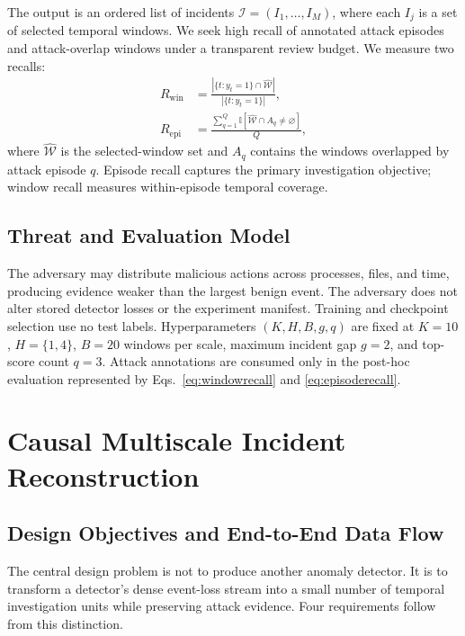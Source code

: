 \documentclass[lettersize,journal]{IEEEtran}
\newcommand{\ind}{\mathbb{I}}
\begin{document}
The output is an ordered list of incidents
$\mathcal{I}=(I_1,\ldots,I_M)$, where each $I_j$ is a set of selected temporal
windows.  We seek high recall of annotated attack episodes and attack-overlap
windows under a transparent review budget.  We measure two recalls:
\begin{align}
 R_{\mathrm{win}} & = \frac{|\{t:y_t=1\}\cap\widehat{\mathcal W}|}
 {|\{t:y_t=1\}|}, \label{eq:windowrecall}\\
 R_{\mathrm{epi}} & = \frac{\sum_{q=1}^{Q}
 \ind[\widehat{\mathcal W}\cap A_q\neq\varnothing]}{Q},
 \label{eq:episoderecall}
\end{align}
where $\widehat{\mathcal W}$ is the selected-window set and $A_q$ contains the
windows overlapped by attack episode $q$.  Episode recall captures the primary
investigation objective; window recall measures within-episode temporal
coverage.

\subsection{Threat and Evaluation Model}

The adversary may distribute malicious actions across processes, files, and
time, producing evidence weaker than the largest benign event.  The adversary
does not alter stored detector losses or the experiment manifest.  Training and
checkpoint selection use no test labels.  Hyperparameters $(K,H,B,g,q)$ are
fixed at $K=10$, $H=\{1,4\}$, $B=20$ windows per scale, maximum incident gap
$g=2$, and top-score count $q=3$.  Attack annotations are consumed only in the
post-hoc evaluation represented by Eqs.~\eqref{eq:windowrecall} and
\eqref{eq:episoderecall}.

\section{Causal Multiscale Incident Reconstruction}
\label{sec:method}

\subsection{Design Objectives and End-to-End Data Flow}

The central design problem is not to produce another anomaly detector.  It is to
transform a detector's dense event-loss stream into a small number of temporal
investigation units while preserving attack evidence.  Four requirements follow
from this distinction.
\end{document}
